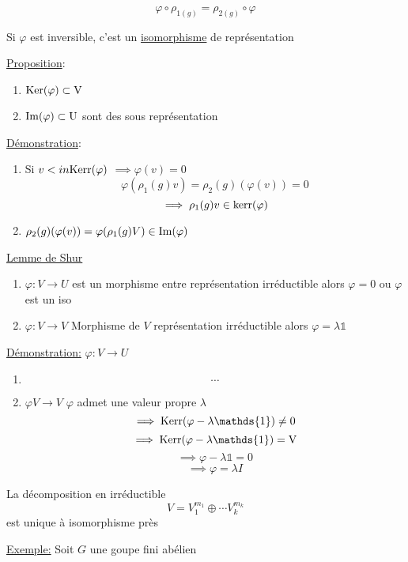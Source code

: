 \[ \varphi \circ \rho_{1(g)} = \rho_{2(g)} \circ \varphi \]


Si $\varphi$ est inversible, c'est un \underline{isomorphisme} de représentation



\underline{Proposition}: 

\begin{enumerate}
	\item $\rm{Ker}(\varphi) \subset V$
	\item $\rm{Im}(\varphi) \subset U$
	sont des sous représentation 
\end{enumerate}

\underline{Démonstration}:


\begin{enumerate}
	\item Si $v <in \rm{Kerr}(\varphi)$
		$\implies \varphi(v)= 0$
		\[ \varphi(\rho_1(g) v) = \rho_2 (g) (\varphi(v)) = 0 \]
		\[ \implies \rho_1 (g) v \in \rm{kerr}(\varphi) \]
	\item $\rho_2(g) (\varphi (v)) = \varphi(\rho_1 (g) V) \in \rm{Im} (\varphi)$
\end{enumerate}

\underline{Lemme de Shur} 
\begin{enumerate}
	\item $\varphi: V \to U$ est un morphisme entre représentation irréductible alors $\varphi=0$ ou $\varphi$ est un iso 
	\item $\varphi: V \to V$ Morphisme de $V$ représentation irréductible alors $\varphi= \lambda \mathds{1}$
\end{enumerate}

\underline{Démonstration:} $ \varphi: V \to U$ 

\begin{enumerate}
	\item \[ \dotsb \]
	\item $\varphi V\to V$
		$\varphi$ admet une valeur propre $\lambda$
		\[ \implies \rm{Kerr}(\varphi - \lambda \mathds{1}) \neq 0 \]
		\[ \implies \rm{Kerr}(\varphi - \lambda \mathds{1}) = V \]
		\[ \implies \varphi - \lambda \mathds{1} = 0 \]
		\[ \implies \varphi = \lambda I \]
\end{enumerate}


La décomposition en irréductible \[ V = V_1^{m_{1}} \oplus \dotsb V_k^{m_{k}}  \] est unique à isomorphisme près



\underline{Exemple:}
Soit $G$ une goupe fini abélien 

